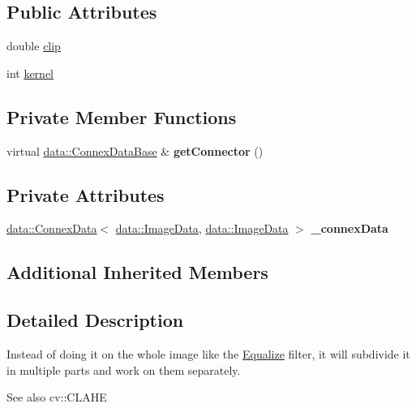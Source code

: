 \subsection*{Public Attributes}
\begin{DoxyCompactItemize}
\item 
double \hyperlink{classfilter_1_1algos_1_1_equalize_adaptive_a46afdee63800444f373e4eae9fc9cc3a}{clip}
\item 
int \hyperlink{classfilter_1_1algos_1_1_equalize_adaptive_ae190d8c8f0cb57cd1a2fb2fc778c963a}{kernel}
\end{DoxyCompactItemize}
\subsection*{Private Member Functions}
\begin{DoxyCompactItemize}
\item 
\mbox{\label{classfilter_1_1algos_1_1_equalize_adaptive_ab31327e7baf064f4287d99e013a0e6e4}} 
virtual \hyperlink{classfilter_1_1data_1_1_connex_data_base}{data\+::\+Connex\+Data\+Base} \& {\bfseries get\+Connector} ()
\end{DoxyCompactItemize}
\subsection*{Private Attributes}
\begin{DoxyCompactItemize}
\item 
\mbox{\label{classfilter_1_1algos_1_1_equalize_adaptive_a4209d59f9412e9ef1d562a66f10f1e93}} 
\hyperlink{classfilter_1_1data_1_1_connex_data}{data\+::\+Connex\+Data}$<$ \hyperlink{classfilter_1_1data_1_1_image_data}{data\+::\+Image\+Data}, \hyperlink{classfilter_1_1data_1_1_image_data}{data\+::\+Image\+Data} $>$ {\bfseries \+\_\+connex\+Data}
\end{DoxyCompactItemize}
\subsection*{Additional Inherited Members}


\subsection{Detailed Description}
Instead of doing it on the whole image like the \hyperlink{classfilter_1_1algos_1_1_equalize}{Equalize} filter, it will subdivide it in multiple parts and work on them separately. \begin{DoxySeeAlso}{See also}
cv\+::\+C\+L\+A\+HE 
\end{DoxySeeAlso}


